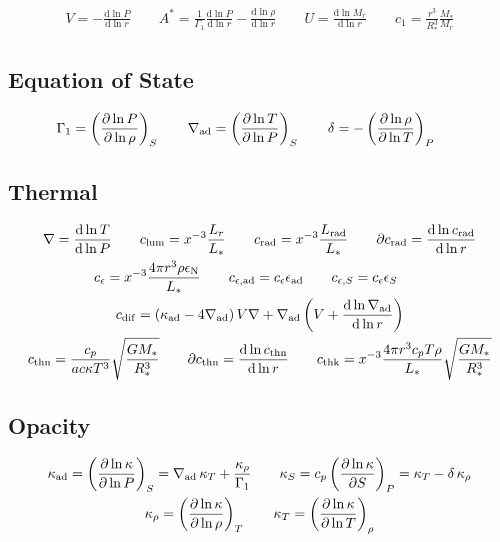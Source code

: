 \documentclass[fleqn]{article}
\newcommand{\diff}{\mathrm{d}}
\newcommand{\As}{A^{\ast}}
\newcommand{\nabad}{\nabla_{\rm ad}}
\newcommand{\kapad}{\kappa_{\rm ad}}
\newcommand{\kapS}{\kappa_{S}}
\newcommand{\kaprho}{\kappa_{\rho}}
\newcommand{\kapT}{\kappa_{T}}
\newcommand{\epsad}{\epsilon_{\rm ad}}
\newcommand{\epsS}{\epsilon_{S}}
\newcommand{\clum}{c_{\rm lum}}
\newcommand{\crad}{c_{\rm rad}}
\newcommand{\ceps}{c_{\epsilon}}
\newcommand{\cepsad}{c_{\epsilon,{\rm ad}}}
\newcommand{\cepsS}{c_{\epsilon,S}}
\newcommand{\cdif}{c_{\rm dif}}
\newcommand{\cthn}{c_{\rm thn}}
\newcommand{\cthk}{c_{\rm thk}}
\newcommand{\Rstar}{R_{\ast}}
\newcommand{\Mstar}{M_{\ast}}
\newcommand{\Lrad}{L_{\rm rad}}
\newcommand{\Lstar}{L_{\ast}}
\begin{document}
\begin{gather*}
V = -\frac{\diff \ln P}{\diff \ln r} \qquad
\As = \frac{1}{\Gamma_{1}} \frac{\diff \ln P}{\diff \ln r} - \frac{\diff \ln \rho}{\diff \ln r} \qquad
U = \frac{\diff \ln M_{r}}{\diff \ln r} \qquad
c_1 = \frac{r^{3}}{\Rstar^{3}} \frac{\Mstar}{M_{r}} 
\end{gather*}

\subsection*{Equation of State}

\begin{gather*}
\Gamma_{1} = \left( \frac{\partial \ln P}{\partial \ln \rho} \right)_{S} \qquad
\nabad = \left( \frac{\partial \ln T}{\partial \ln P} \right)_{S} \qquad
\delta = - \left( \frac{\partial \ln \rho}{\partial \ln T} \right)_{P} \qquad
\end{gather*}

\subsection*{Thermal}

\begin{gather*}
\nabla = \frac{\diff \ln T}{\diff \ln P} \qquad
\clum = x^{-3} \frac{L_{r}}{\Lstar} \qquad
\crad = x^{-3} \frac{\Lrad}{\Lstar} \qquad
\partial\crad = \frac{\diff \ln \crad}{\diff \ln r} \\
\ceps = x^{-3} \frac{4\pi r^{3} \rho \epsilon_{\rm N}}{\Lstar} \qquad
\cepsad = \ceps \epsad \qquad \cepsS = \ceps \epsS \qquad \\
\cdif = \left( \kapad - 4 \nabad \right) V \nabla + \nabad \left(V + \frac{\diff \ln \nabad}{\diff \ln r} \right) \\
\cthn = \frac{c_{p}}{a c \kappa T^{3}} \sqrt{\frac{G\Mstar}{\Rstar^{3}}} \qquad
\partial\cthn = \frac{\diff \ln \cthn}{\diff \ln r} \qquad
\cthk = x^{-3} \frac{4\pi r^{3} c_{p} T \rho}{\Lstar} \sqrt{\frac{G\Mstar}{\Rstar^{3}}} \\
\end{gather*}

\subsection*{Opacity}

\begin{gather*}
\kapad = \left( \frac{\partial \ln \kappa}{\partial \ln P} \right)_{S} = \nabad\, \kapT + \frac{\kaprho}{\Gamma_{1}} \qquad
\kapS = c_{p} \left( \frac{\partial \ln \kappa}{\partial S} \right)_{P} = \kapT - \delta\, \kaprho \\
\kaprho = \left( \frac{\partial \ln \kappa}{\partial \ln \rho} \right)_{T} \qquad
\kapT = \left( \frac{\partial \ln \kappa}{\partial \ln T} \right)_{\rho}
\end{gather*}
\end{document}
